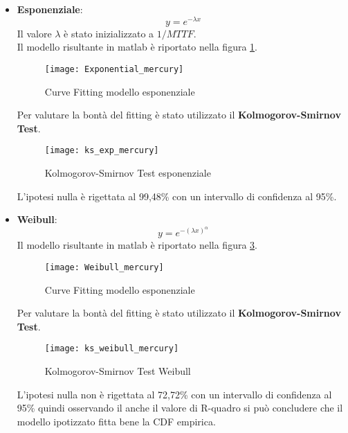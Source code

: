 \begin{itemize}
  \item \textbf{Esponenziale}:
  $$ y = e^{- \lambda  x} $$
  Il valore $\lambda$ è stato inizializzato a $1/MTTF$.\\
  Il modello risultante in matlab è riportato nella figura \ref{Exponential_mercury}.\\

  \begin{figure}[!htbp]
    \texttt{[image: Exponential\_mercury]}
    \caption{Curve Fitting modello esponenziale}
    \label{Exponential_mercury}
  \end{figure}

  Per valutare la bontà del fitting è stato utilizzato il \textbf{Kolmogorov-Smirnov Test}.\\

  \begin{figure}[!htbp]
    \centering
    \texttt{[image: ks\_exp\_mercury]}
    \caption{Kolmogorov-Smirnov Test esponenziale}
    \label{ks_exp_mercury}
  \end{figure}

  L'ipotesi nulla è rigettata al 99,48\% con un intervallo di confidenza al 95\%.

  \clearpage

  \item \textbf{Weibull}:
  $$ y = e^{- (\lambda x)^\alpha} $$
  Il modello risultante in matlab è riportato nella figura \ref{Weibull_mercury}.\\
  \begin{figure}[!htbp]
    \texttt{[image: Weibull\_mercury]}
    \caption{Curve Fitting modello esponenziale}
    \label{Weibull_mercury}
  \end{figure}

  Per valutare la bontà del fitting è stato utilizzato il \textbf{Kolmogorov-Smirnov Test}.\\

  \begin{figure}[!htbp]
    \centering
    \texttt{[image: ks\_weibull\_mercury]}
    \caption{Kolmogorov-Smirnov Test Weibull}
    \label{ks_weibull_mercury}
  \end{figure}

  L'ipotesi nulla non è rigettata al 72,72\% con un intervallo di confidenza al
  95\% quindi osservando il anche il valore di R-quadro si può concludere che il
  modello ipotizzato fitta bene la CDF empirica.\\


\end{itemize}
